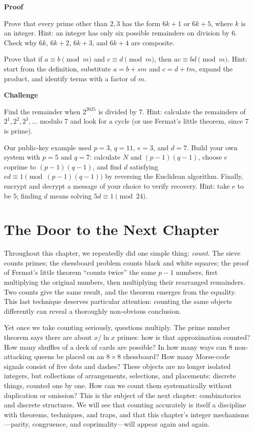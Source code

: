 \textbf{Proof}
\begin{sikao}
  \item Prove that every prime other than $2,3$ has the form $6k+1$ or $6k+5$, where $k$ is an integer. Hint: an integer has only six possible remainders on division by $6$. Check why $6k$, $6k+2$, $6k+3$, and $6k+4$ are composite.
  \item Prove that if $a\equiv b\pmod{m}$ and $c\equiv d\pmod{m}$, then $ac\equiv bd\pmod{m}$. Hint: start from the definition, substitute $a=b+sm$ and $c=d+tm$, expand the product, and identify terms with a factor of $m$.
\end{sikao}

\textbf{Challenge}
\begin{sikao}
  \item Find the remainder when $2^{2025}$ is divided by $7$. Hint: calculate the remainders of $2^1,2^2,2^3,\dots$ modulo $7$ and look for a cycle (or use Fermat's little theorem, since $7$ is prime).
  \item Our public-key example used $p=3$, $q=11$, $e=3$, and $d=7$. Build your own system with $p=5$ and $q=7$: calculate $N$ and $(p-1)(q-1)$, choose $e$ coprime to $(p-1)(q-1)$, and find $d$ satisfying $ed\equiv1\pmod{(p-1)(q-1)}$ by reversing the Euclidean algorithm. Finally, encrypt and decrypt a message of your choice to verify recovery. Hint: take $e$ to be $5$; finding $d$ means solving $5d\equiv1\pmod{24}$.
\end{sikao}

\section*{The Door to the Next Chapter}

Throughout this chapter, we repeatedly did one simple thing: \emph{count}. The sieve counts primes; the chessboard problem counts black and white squares; the proof of Fermat's little theorem ``counts twice'' the same $p-1$ numbers, first multiplying the original numbers, then multiplying their rearranged remainders. Two counts give the same result, and the theorem emerges from the equality. This last technique deserves particular attention: counting the same objects differently can reveal a thoroughly non-obvious conclusion.

Yet once we take counting seriously, questions multiply. The prime number theorem says there are about $x/\ln x$ primes: how is that approximation counted? How many shuffles of a deck of cards are possible? In how many ways can $8$ non-attacking queens be placed on an $8\times8$ chessboard? How many Morse-code signals consist of five dots and dashes? These objects are no longer isolated integers, but collections of arrangements, selections, and placements: discrete things, counted one by one. How can we count them systematically without duplication or omission? This is the subject of the next chapter: combinatorics and discrete structures. We will see that counting accurately is itself a discipline with theorems, techniques, and traps, and that this chapter's integer mechanisms---parity, congruence, and coprimality---will appear again and again.
